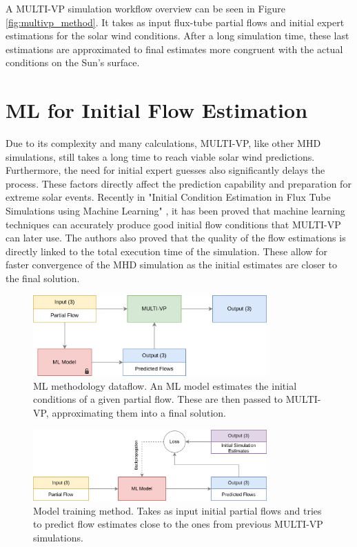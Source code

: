 A MULTI-VP simulation workflow overview can be seen in Figure \ref{fig:multivp_method}. It takes as input flux-tube partial flows and initial expert estimations for the solar wind conditions. After a long simulation time, these last estimations are approximated to final estimates more congruent with the actual conditions on the Sun's surface.




\section{ML for Initial Flow Estimation}\label{sec:ml_initial_flow}
Due to its complexity and many calculations, MULTI-VP, like other MHD simulations, still takes a long time to reach viable solar wind predictions. Furthermore, the need for initial expert guesses also significantly delays the process. These factors directly affect the prediction capability and preparation for extreme solar events. Recently in "Initial Condition Estimation in Flux Tube Simulations using Machine Learning" \cite{barros_InitialConditionEstimation_}, it has been proved that machine learning techniques can accurately produce good initial flow conditions that MULTI-VP can later use. The authors also proved that the quality of the flow estimations is directly linked to the total execution time of the simulation. These allow for faster convergence of the MHD simulation as the initial estimates are closer to the final solution. 

\begin{figure}[h]
\centering
\includegraphics[width=0.8\textwidth]{figures/multivp_rnn.png}
\caption[ML methodology dataflow]{ML methodology dataflow. An ML model estimates the initial conditions of a given partial flow. These are then passed to MULTI-VP, approximating them into a final solution. \label{fig:multivp_rnn}}
\end{figure}

\begin{figure}[]
    \centering
    \includegraphics[width=0.8\textwidth]{figures/rnn_training.png}
    \caption[ML training phase]{Model training method. Takes as input initial partial flows and tries to predict flow estimates close to the ones from previous MULTI-VP simulations.\label{fig:rnn_train}}
\end{figure}

